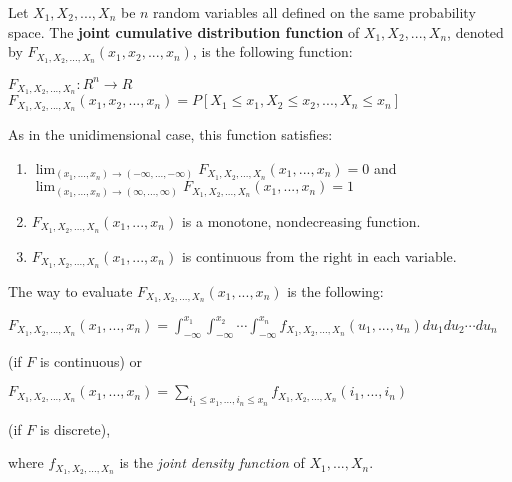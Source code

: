 \documentclass{article}
\begin{document}
Let $X_1, X_2, ..., X_n$ be $n$ random variables all defined on the same probability space. The \textbf{joint cumulative distribution function} of $X_1, X_2, ..., X_n$, denoted by $F_{X_1, X_2, ..., X_n}(x_1,x_2,...,x_n)$, is the following function:\\
\par
$F_{X_1, X_2, ..., X_n}: R^n \to R$\\
$F_{X_1, X_2, ..., X_n}(x_1,x_2,...,x_n) = P[X_1 \leq x_1, X_2 \leq x_2, ... , X_n \leq x_n]$\\
\par
As in the unidimensional case, this function satisfies:\\
\par
\begin{enumerate}
\item $\lim_{(x_1,...,x_n) \to (-\infty,...,-\infty)}{F_{X_1, X_2, ..., X_n}(x_1,...,x_n)} = 0$  and  $\lim_{(x_1,...,x_n) \to (\infty,...,\infty)}{F_{X_1, X_2, ..., X_n}(x_1,...,x_n)} = 1$
\item $F_{X_1, X_2, ..., X_n}(x_1,...,x_n)$ is a monotone, nondecreasing function.
\item $F_{X_1, X_2, ..., X_n}(x_1,...,x_n)$ is continuous from the right in each variable.
\end{enumerate}

The way to evaluate $F_{X_1, X_2, ..., X_n}(x_1,...,x_n)$ is the following:\\
\par
$F_{X_1, X_2, ..., X_n}(x_1,...,x_n) = \int_{-\infty}^{x_1}{   \int_{-\infty}^{x_2}{ \cdots \int_{-\infty}^{x_n}{   f_{X_1, X_2, ..., X_n}(u_1,...,u_n)    du_1 du_2 \cdots du_n}}}$\\
\par
(if $F$ is continuous) or\\
\par
$F_{X_1, X_2, ..., X_n}(x_1,...,x_n) = \sum_{i_1 \leq x_1, ... , i_n \leq x_n}^{} {  f_{X_1, X_2, ..., X_n}(i_1,...,i_n)  }$\\
\par
(if $F$ is discrete), \\
\par
where $f_{X_1, X_2, ..., X_n}$ is the \emph{joint density function} of  $X_1, ..., X_n$.
\end{document}
